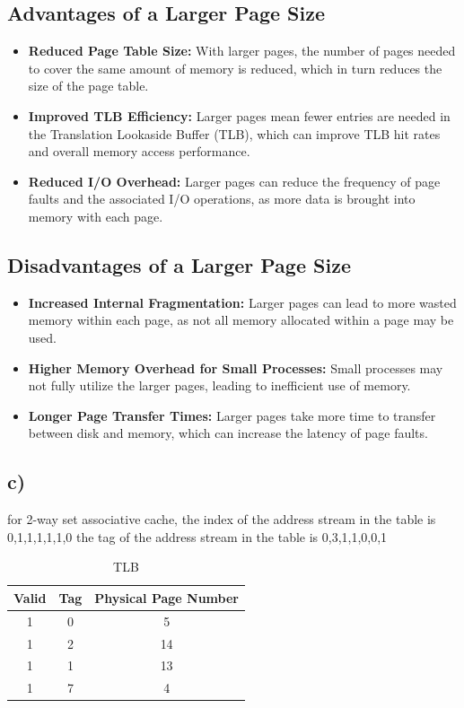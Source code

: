 \documentclass[cn,12pt]{homework}
\begin{document}
\begin{solution}
\subsection*{Advantages of a Larger Page Size}
\begin{itemize}
  \item \textbf{Reduced Page Table Size:} With larger pages, the number of pages needed to cover the same amount of memory is reduced, which in turn reduces the size of the page table.
  \item \textbf{Improved TLB Efficiency:} Larger pages mean fewer entries are needed in the Translation Lookaside Buffer (TLB), which can improve TLB hit rates and overall memory access performance.
  \item \textbf{Reduced I/O Overhead:} Larger pages can reduce the frequency of page faults and the associated I/O operations, as more data is brought into memory with each page.
\end{itemize}

\subsection*{Disadvantages of a Larger Page Size}
\begin{itemize}
  \item \textbf{Increased Internal Fragmentation:} Larger pages can lead to more wasted memory within each page, as not all memory allocated within a page may be used.
  \item \textbf{Higher Memory Overhead for Small Processes:} Small processes may not fully utilize the larger pages, leading to inefficient use of memory.
  \item \textbf{Longer Page Transfer Times:} Larger pages take more time to transfer between disk and memory, which can increase the latency of page faults.
\end{itemize}





\subsection*{c)}
for 2-way set associative cache, 
the index of the address stream in the table is 0,1,1,1,1,1,0
the tag of the address stream in the table is   0,3,1,1,0,0,1

\begin{table}[H]
\centering
\caption{TLB}
\begin{tabular}{|c|c|c|}
\hline
Valid & Tag & Physical Page Number \\ \hline
1 & 0 & 5 \\ \hline
1 & 2 & 14 \\ \hline
1 & 1 & 13 \\ \hline
1 & 7 & 4 \\ \hline
\end{tabular}
\end{table}



\end{solution}
\end{document}
